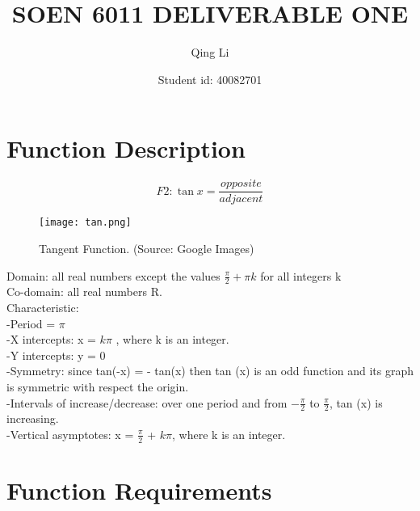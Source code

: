 \documentclass[12pt]{article}
\title{SOEN 6011 DELIVERABLE ONE}
\author{Qing Li}
\date{Student id: 40082701}
\begin{document}
\maketitle


\section{Function Description}
\begin{equation}
    F2:  \tan{x}=\frac{opposite}{adjacent}
\end{equation}
  
\begin{figure}[ht]
\centering
\texttt{[image: tan.png]}
\caption{Tangent Function.  (Source: Google Images)}
\label{fig:label}
\end{figure}

Domain: all real numbers except the values $ \frac{\pi}{2} + \pi k $ for all integers k \\

Co-domain: all real numbers R.\\

Characteristic:\\

-Period = $\pi$\\ 

-X intercepts: x = $k\pi$ , where k is an integer.\\ 

-Y intercepts: y = 0 \\

-Symmetry: since tan(-x) = - tan(x) then tan (x) is an odd function and its graph is symmetric with respect the origin. \\

-Intervals of increase/decrease: over one period and from $-\frac{\pi}{2}$ to $\frac{\pi}{2}$, tan (x) is increasing.\\

-Vertical asymptotes: x = $\frac{\pi}{2}$ + $k\pi$, where k is an integer. \\



\section{Function Requirements}
\end{document}
